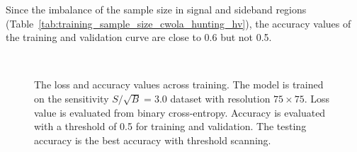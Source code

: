 \documentclass[12pt]{article}
\begin{document}
			Since the imbalance of the sample size in signal and sideband regions (Table~\ref{tab:training_sample_size_cwola_hunting_hv}), the accuracy values of the training and validation curve are close to 0.6 but not 0.5. 
			\begin{figure}[htpb]
				\centering
				 \\ 
				\caption{The loss and accuracy values across training. The model is trained on the sensitivity $S / \sqrt{B} = 3.0$ dataset with resolution $75\times 75$. Loss value is evaluated from binary cross-entropy. Accuracy is evaluated with a threshold of 0.5 for training and validation. The testing accuracy is the best accuracy with threshold scanning.}
				\label{fig:loss_acc_across_training_SB_3_res_75}
			\end{figure}
\end{document}
